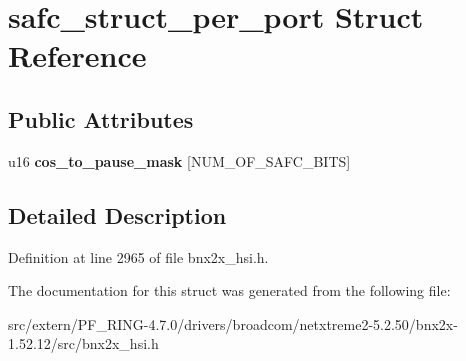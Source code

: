 \hypertarget{structsafc__struct__per__port}{
\section{safc\_\-struct\_\-per\_\-port Struct Reference}
\label{structsafc__struct__per__port}
}
\subsection*{Public Attributes}
\begin{DoxyCompactItemize}
\item 
\hypertarget{structsafc__struct__per__port_a11ab3c0c44a1489f4a6cb1d299938e84}{
u16 {\bfseries cos\_\-to\_\-pause\_\-mask} \mbox{[}NUM\_\-OF\_\-SAFC\_\-BITS\mbox{]}}
\label{structsafc__struct__per__port_a11ab3c0c44a1489f4a6cb1d299938e84}

\end{DoxyCompactItemize}


\subsection{Detailed Description}


Definition at line 2965 of file bnx2x\_\-hsi.h.



The documentation for this struct was generated from the following file:\begin{DoxyCompactItemize}
\item 
src/extern/PF\_\-RING-\/4.7.0/drivers/broadcom/netxtreme2-\/5.2.50/bnx2x-\/1.52.12/src/bnx2x\_\-hsi.h\end{DoxyCompactItemize}
